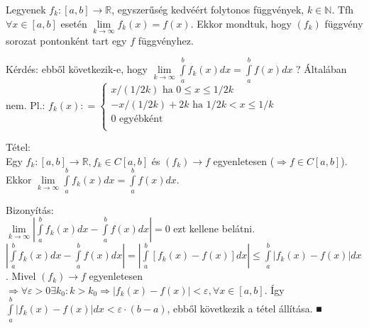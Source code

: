 \documentclass[12pt,a4paper]{scrartcl}
\begin{document}
Legyenek
\(\left. f_{k}:\left\lbrack {a,b} \right\rbrack\rightarrow{\mathbb{R}} \right.\),
egyszerűség kedvéért folytonos függvények, \(k \in {\mathbb{N}}\). Tfh
\(\forall x \in \left\lbrack {a,b} \right\rbrack\) esetén
\(\underset{k\rightarrow\infty}{\lim}f_{k}\left( x \right) = f\left( x \right)\).
Ekkor mondtuk, hogy \(\left( f_{k} \right)\) függvény sorozat pontonként
tart egy \(f\) függvényhez.

\begin{megj_extra}

Kérdés: ebből következik-e, hogy
\(\underset{k\rightarrow\infty}{\lim}{\int\limits_{a}^{b}{f_{k}\left( x \right)dx}} = {\int\limits_{a}^{b}{f\left( x \right)dx}}\)
? Általában nem. Pl.:
\(f_{k}\left( x \right): = \left\{ \begin{array}{l} {x/\left( {1/2k} \right)\text{~ha~0} \leq x \leq 1/2k} \\ {- x/\left( {1/2k} \right) + 2k\text{~ha~}1/2k < x \leq 1/k} \\ {0\text{~egyébként}} \\ \end{array} \right.\)

\end{megj_extra}

\begin{tetel_extra}

Tétel:\\
Egy
\(\left. f_{k}:\left\lbrack {a,b} \right\rbrack\rightarrow{\mathbb{R}},f_{k} \in C\left\lbrack {a,b} \right\rbrack \right.\)
és \(\left. \left( f_{k} \right)\rightarrow f \right.\) egyenletesen
(\(\left. \Rightarrow f \in C\left\lbrack {a,b} \right\rbrack \right.\)).
Ekkor
\(\underset{k\rightarrow\infty}{\lim}{\int\limits_{a}^{b}{f_{k}\left( x \right)dx}} = {\int\limits_{a}^{b}{f\left( x \right)dx}}\).

\end{tetel_extra}

\begin{biz_extra}

Bizonyítás:\\
\(\underset{k\rightarrow\infty}{\lim}\left| {{\int\limits_{a}^{b}{f_{k}\left( x \right)dx}} - {\int\limits_{a}^{b}{f\left( x \right)dx}}} \right| = 0\)
ezt kellene belátni.
\(\left| {{\int\limits_{a}^{b}{f_{k}\left( x \right)dx}} - {\int\limits_{a}^{b}{f\left( x \right)dx}}} \right| = \left| {\int\limits_{a}^{b}{\left\lbrack {f_{k}\left( x \right) - f\left( x \right)} \right\rbrack dx}} \right| \leq {\int\limits_{a}^{b}{\left| {f_{k}\left( x \right) - f\left( x \right)} \right|dx}}\).
Mivel \(\left. \left( f_{k} \right)\rightarrow f \right.\) egyenletesen
\(\left. \Rightarrow\forall\varepsilon > 0\exists k_{0}:k > k_{0}\Rightarrow\left| {f_{k}\left( x \right) - f\left( x \right)} \right| < \varepsilon,\forall x \in \left\lbrack {a,b} \right\rbrack \right.\).
Így
\(\int\limits_{a}^{b}{\left| {f_{k}\left( x \right) - f\left( x \right)} \right|dx < \varepsilon \cdot \left( {b - a} \right)}\),
ebből következik a tétel állítása. ■

\end{biz_extra}
\end{document}

